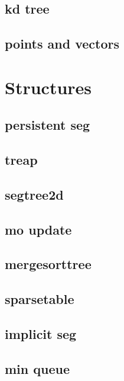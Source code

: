 \subsection{kd tree}
\raggedbottom
\hrulefill
\subsection{points and vectors}
\raggedbottom
\hrulefill

\section{Structures}
\subsection{persistent seg}
\raggedbottom
\hrulefill
\subsection{treap}
\raggedbottom
\hrulefill
\subsection{segtree2d}
\raggedbottom
\hrulefill
\subsection{mo update}
\raggedbottom
\hrulefill
\subsection{mergesorttree}
\raggedbottom
\hrulefill
\subsection{sparsetable}
\raggedbottom
\hrulefill
\subsection{implicit seg}
\raggedbottom
\hrulefill
\subsection{min queue}
\raggedbottom
\hrulefill
